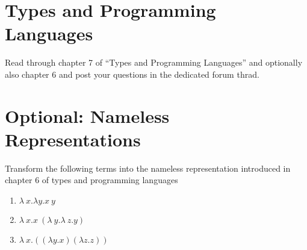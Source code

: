 \section{Types and Programming Languages}
Read through chapter 7 of ``Types and Programming Languages'' and optionally also chapter 6 and post your questions in the dedicated forum thrad.

\section{Optional: Nameless Representations}
Transform the following terms into the nameless representation introduced in chapter 6 of types and programming languages 
\begin{enumerate}
  \item $\lambda\ x. \lambda y. x\ y$
  \item $\lambda\ x. x\ (\lambda\ y. \lambda\ z. y)$
  \item $\lambda\ x. ((\lambda y. x) (\lambda z. z))$
\end{enumerate}
